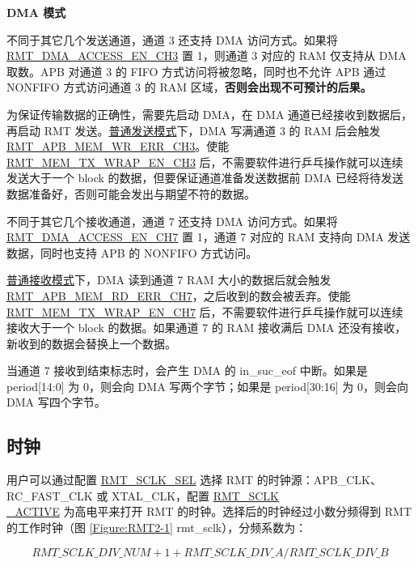 \documentclass[main\_\_CN.tex]{subfiles}
\begin{document}
\textbf{DMA 模式}

不同于其它几个发送通道，通道 3 还支持 DMA 访问方式。如果将 \hyperref[fielddesc:RMTDMAACCESSENCH3]{RMT\_DMA\_ACCESS\_EN\_CH3} 置 1，则通道 3 对应的 RAM 仅支持从 DMA 取数。APB 对通道 3 的 FIFO 方式访问将被忽略，同时也不允许 APB 通过 NONFIFO 方式访问通道 3 的 RAM 区域，\textbf{否则会出现不可预计的后果。}

为保证传输数据的正确性，需要先启动 DMA，在 DMA 通道已经接收到数据后，再启动 RMT 发送。\hyperref[sec:normal-tx-mode]{普通发送模式}下，DMA 写满通道 3 的 RAM 后会触发 \hyperref[fielddesc:RMTAPBMEMWRERRCHN]{RMT\_APB\_MEM\_WR\_ERR\_CH3}。使能 \hyperref[fielddesc:RMTMEMTXWRAPENCHN]{RMT\_MEM\_TX\_WRAP\_EN\_CH3} 后，不需要软件进行乒乓操作就可以连续发送大于一个 block 的数据，但要保证通道准备发送数据前 DMA 已经将待发送数据准备好，否则可能会发出与期望不符的数据。

不同于其它几个接收通道，通道 7 还支持 DMA 访问方式。如果将 \hyperref[fielddesc:RMTDMAACCESSENCH7]{RMT\_DMA\_ACCESS\_EN\_CH7} 置 1，通道 7 对应的 RAM 支持向 DMA 发送数据，同时也支持 APB 的 NONFIFO 方式访问。

\hyperref[sec:normal-rx-mode]{普通接收模式}下，DMA 读到通道 7 RAM 大小的数据后就会触发 \hyperref[fielddesc:RMTAPBMEMRDERRCHM]{RMT\_APB\_MEM\_RD\_ERR\_CH7}，之后收到的数会被丢弃。使能 \hyperref[fielddesc:RMTMEMRXWRAPENCHM]{RMT\_MEM\_TX\_WRAP\_EN\_CH7} 后，不需要软件进行乒乓操作就可以连续接收大于一个 block 的数据。如果通道 7 的 RAM 接收满后 DMA 还没有接收，新收到的数据会替换上一个数据。

\begin{tiplisting}
当通道 7 接收到结束标志时，会产生 DMA 的 in\_suc\_eof 中断。如果是 period[14:0] 为 0，则会向 DMA 写两个字节；如果是 period[30:16] 为 0，则会向 DMA 写四个字节。
\end{tiplisting}

\subsection{时钟}\label{clock}
用户可以通过配置 \hyperref[fielddesc:RMTSCLKSEL]{RMT\_SCLK\_SEL} 选择 RMT 的时钟源：APB\_CLK、RC\_FAST\_CLK 或 XTAL\_CLK，配置 \hyperref[fielddesc:RMTSCLKACTIVE]{RMT\_SCLK\\\_ACTIVE} 为高电平来打开 RMT 的时钟。选择后的时钟经过小数分频得到 RMT 的工作时钟（图 \ref{Figure:RMT2-1} rmt\_sclk），分频系数为：

$$
\hyperref[fielddesc:RMTSCLKDIVNUM]{RMT\_SCLK\_DIV\_NUM} + 1 + \hyperref[fielddesc:RMTSCLKDIVA]{RMT\_SCLK\_DIV\_A}/\hyperref[fielddesc:RMTSCLKDIVB]{RMT\_SCLK\_DIV\_B}
$$ \label{relation-1}
\end{document}
